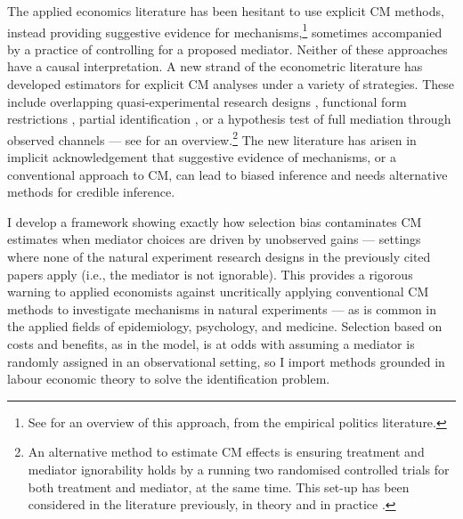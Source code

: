 The applied economics literature has been hesitant to use explicit CM methods, instead providing suggestive evidence for mechanisms,\footnote{
    See \cite{blackwell2024assumption} for an overview of this approach, from the empirical politics literature.
} sometimes accompanied by a practice of controlling for a proposed mediator.
Neither of these approaches have a causal interpretation.
A new strand of the econometric literature has developed estimators for explicit CM analyses under a variety of strategies.
These include overlapping quasi-experimental research designs \citep{deuchert2019direct,frolich2017direct}, functional form restrictions \citep{heckman2015econometric,heckman2013understanding}, partial identification \citep{flores2009identification}, or a hypothesis test of full mediation through observed channels \citep{kwon2024testing} --- see \cite{huber2019review} for an overview.\footnote{
    An alternative method to estimate CM effects is ensuring treatment and mediator ignorability holds by a running two randomised controlled trials for both treatment and mediator, at the same time.
    This set-up has been considered in the literature previously, in theory \citep{imai2013experimental} and in practice \citep{ludwig2011mechanism}.
}
The new literature has arisen in implicit acknowledgement that suggestive evidence of mechanisms, or a conventional approach to CM, can lead to biased inference and needs alternative methods for credible inference.

I develop a framework showing exactly how selection bias contaminates CM estimates when mediator choices are driven by unobserved gains --- settings where none of the natural experiment research designs in the previously cited papers apply (i.e., the mediator is not ignorable).
This provides a rigorous warning to applied economists against uncritically applying conventional CM methods to investigate mechanisms in natural experiments --- as is common in the applied fields of epidemiology, psychology, and medicine.
Selection based on costs and benefits, as in the \cite{roy1951some} model, is at odds with assuming a mediator is randomly assigned in an observational setting, so I import methods grounded in labour economic theory to solve the identification problem.

